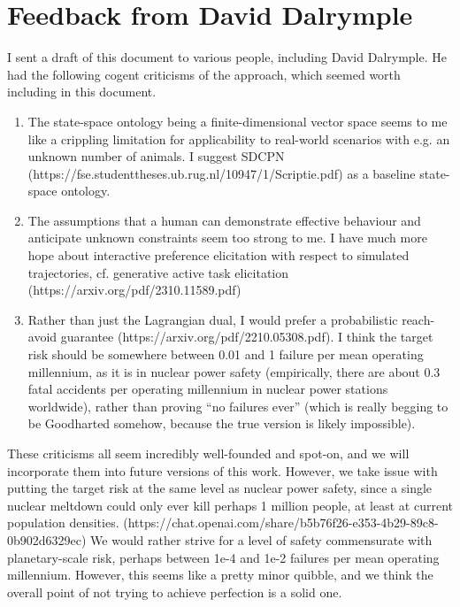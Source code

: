 \documentclass[11pt]{article}
\begin{document}
\section{Feedback from David Dalrymple}

I sent a draft of this document to various people, including David
Dalrymple. He had the following cogent criticisms of the approach,
which seemed worth including in this document.

\begin{enumerate}
\item The state-space ontology being a finite-dimensional vector space
  seems to me like a crippling limitation for applicability to
  real-world scenarios with e.g. an unknown number of animals. I
  suggest SDCPN
  (https://fse.studenttheses.ub.rug.nl/10947/1/Scriptie.pdf) as a
  baseline state-space ontology.
\item The assumptions that a human can demonstrate effective behaviour
  and anticipate unknown constraints seem too strong to me. I have
  much more hope about interactive preference elicitation with respect
  to simulated trajectories, cf. generative active task elicitation
  (https://arxiv.org/pdf/2310.11589.pdf)
\item Rather than just the Lagrangian dual, I would prefer a
  probabilistic reach-avoid guarantee
  (https://arxiv.org/pdf/2210.05308.pdf). I think the target risk
  should be somewhere between 0.01 and 1 failure per mean operating
  millennium, as it is in nuclear power safety (empirically, there are
  about 0.3 fatal accidents per operating millennium in nuclear power
  stations worldwide), rather than proving ``no failures ever'' (which
  is really begging to be Goodharted somehow, because the true version
  is likely impossible).
\end{enumerate}

These criticisms all seem incredibly well-founded and spot-on, and we
will incorporate them into future versions of this work.  However, we
take issue with putting the target risk at the same level as nuclear
power safety, since a single nuclear meltdown could only ever kill
perhaps 1 million people, at least at current population
densities. (https://chat.openai.com/share/b5b76f26-e353-4b29-89c8-0b902d6329ec)
We would rather strive for a level of safety commensurate with
planetary-scale risk, perhaps between 1e-4 and 1e-2 failures per mean
operating millennium. However, this seems like a pretty minor quibble,
and we think the overall point of not trying to achieve perfection is
a solid one.
\end{document}

